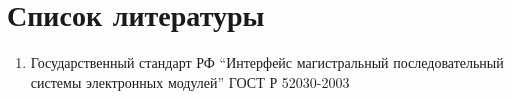 \section {Список литературы}

\begin{enumerate}
 \sloppy
 \item \label{gost_r_52070-2003} Государственный стандарт РФ ``Интерфейс 
магистральный последовательный системы электронных модулей'' ГОСТ Р 52030-2003
\end{enumerate}
